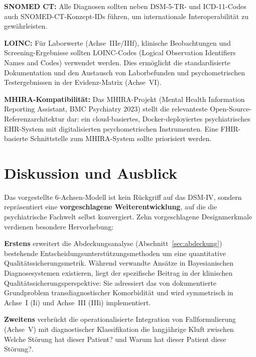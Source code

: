 \documentclass[11pt,a4paper]{article}
\begin{document}
\textbf{SNOMED CT:} Alle Diagnosen sollten neben DSM-5-TR- und ICD-11-Codes auch SNOMED-CT-Konzept-IDs f\"uhren, um internationale Interoperabilit\"at zu gew\"ahrleisten.

\textbf{LOINC:} F\"ur Laborwerte (Achse~IIIe/IIIf), klinische Beobachtungen und Screening-Ergebnisse sollten LOINC-Codes (Logical Observation Identifiers Names and Codes) verwendet werden. Dies erm\"oglicht die standardisierte Dokumentation und den Austausch von Laborbefunden und psychometrischen Testergebnissen in der Evidenz-Matrix (Achse~VI).

\textbf{MHIRA-Kompatibilit\"at:} Das MHIRA-Projekt (Mental Health Information Reporting Assistant, BMC Psychiatry 2023) stellt die relevanteste Open-Source-Referenzarchitektur dar: ein cloud-basiertes, Docker-deployiertes psychiatrisches EHR-System mit digitalisierten psychometrischen Instrumenten. Eine FHIR-basierte Schnittstelle zum MHIRA-System sollte priorisiert werden.


\section{Diskussion und Ausblick}
\label{sec:diskussion}

Das vorgestellte 6-Achsen-Modell ist kein R\"uckgriff auf das DSM-IV, sondern repr\"asentiert eine \textbf{vorgeschlagene Weiterentwicklung}, auf die die psychiatrische Fachwelt selbst konvergiert. Zehn vorgeschlagene Designmerkmale verdienen besondere Hervorhebung:

\textbf{Erstens} erweitert die Abdeckungsanalyse (Abschnitt~\ref{sec:abdeckung}) bestehende Entscheidungsunterst\"utzungsmethoden um eine quantitative Qualit\"atssicherungsmetrik. W\"ahrend verwandte Ans\"atze in Bayesianischen Diagnosesystemen existieren, liegt der spezifische Beitrag in der klinischen Qualit\"atssicherungsperspektive: Sie adressiert das von \citet{PlanaRipoll2019} dokumentierte Grundproblem transdiagnostischer Komorbidit\"at und wird symmetrisch in Achse~I (Ii) und Achse~III (IIIi) implementiert.

\textbf{Zweitens} verbr\"uckt die operationalisierte Integration von Fallformulierung (Achse~V) mit diagnostischer Klassifikation die langj\"ahrige Kluft zwischen \glqq Welche St\"orung hat dieser Patient?\grqq{} und \glqq Warum hat dieser Patient diese St\"orung?\grqq{}.
\end{document}
